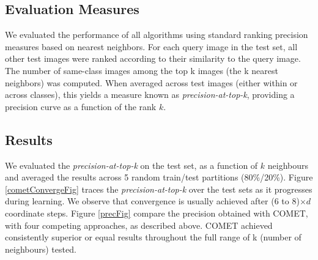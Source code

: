 \documentclass{article}
\begin{document}
{\subsection{Evaluation Measures}
We evaluated the performance of all algorithms using standard ranking precision measures
based on nearest neighbors. For each query image in the test set, all other test images were
ranked according to their similarity to the query image. The number of same-class images
among the top k images (the k nearest neighbors) was computed. When averaged across test
images (either within or across classes), this yields a measure known as \textit{precision-at-top-k},
providing a precision curve as a function of the rank $k$.

\subsection{Results}
 We evaluated the \textit{precision-at-top-k} on the test set, as a function of $k$ neighbours and averaged the results across 5 random train/test partitions (80\%/20\%).
Figure \ref{cometConvergeFig} traces the \textit{precision-at-top-k} over the test sets as it progresses during learning. We observe that convergence is usually achieved after (6 to 8)$\times d$ coordinate steps.
Figure \ref{precFig} compare the precision obtained with COMET, with four competing approaches, as described above. COMET achieved consistently superior or equal results throughout the full range of k (number of neighbours) tested. 



}
\end{document}
